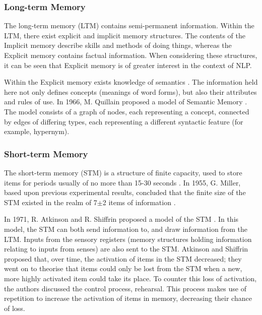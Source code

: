 \documentclass[]{article}
\begin{document}
\subsubsection{Long-term Memory}
\label{LongTerm}
The long-term memory (LTM) contains semi-permanent information. Within the LTM, there exist explicit and implicit memory structures. The contents of the Implicit memory describe skills and methods of doing things, whereas the Explicit memory contains factual information\cite{MemoryBaddeleyEysenkAnderson}. When considering these structures, it can be seen that Explicit memory is of greater interest in the context of NLP.

Within the Explicit memory exists knowledge of semantics \cite{MemoryBaddeleyEysenkAnderson}. The information held here not only defines concepts (meanings of word forms), but also their attributes and rules of use. In 1966, M. Quillain proposed a model of Semantic Memory \cite{SemanticMemoryQuillain}. The model consists of a graph of nodes, each representing a concept, connected by edges of differing types, each representing a different syntactic feature (for example, hypernym).  


\subsubsection{Short-term Memory}
\label{ShortTerm}
The short-term memory (STM) is a structure of finite capacity, used to store items for periods usually of no more than 15-30 seconds \cite{MemoryBaddeleyEysenkAnderson}. In 1955, G. Miller, based upon previous experimental results, concluded that the finite size of the STM existed in the realm of 7$\pm$2 items of information \cite{SevenPlusMinusTwo}. 

In 1971, R. Atkinson and R. Shiffrin proposed a model of the STM \cite{ControlProcessesSTMAtkinson}. In this model, the STM can both send information to, and draw information from the LTM. Inputs from the sensory registers (memory structures holding information relating to inputs from senses) are also sent to the STM. Atkinson and Shiffrin proposed that, over time, the activation of items in the STM decreased; they went on to theorise that items could only be lost from the STM when a new, more highly activated item could take its place. To counter this loss of activation, the authors discussed the control process, rehearsal. This process makes use of repetition to increase the activation of items in memory, decreasing their chance of loss. 
\end{document}
